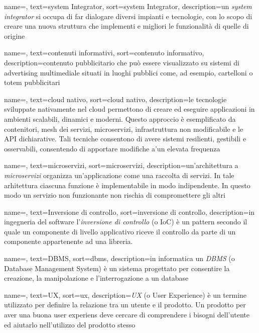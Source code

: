 {
    name=,
    text=system Integrator,
    sort=system Integrator,
    description={un \emph{system integrator} si occupa di far dialogare diversi impianti e tecnologie, con lo scopo di creare una nuova struttura che implementi e migliori le funzionalità di quelle di origine}
}

{
    name=,
    text=contenuti informativi,
    sort=contenuto informativo,
    description={contenuto pubblicitario che può essere visualizzato su sistemi di advertising multimediale situati in luoghi pubblici come, ad esempio, cartelloni o totem pubblicitari}
}

{
    name=,
    text=cloud nativo,
    sort=cloud nativo,
    description={le tecnologie sviluppate nativamente nel cloud permettono di creare ed eseguire applicazioni in ambienti scalabili, dinamici e moderni. Questo approccio è esemplificato da contenitori, mesh dei servizi, microservizi, infrastruttura non modificabile e le API dichiarative. Tali tecniche consentono di avere sistemi resilienti, gestibili e osservabili, consentendo di apportare modifiche a'un elevata frequenza}
}

{
    name=,
    text=microservizi,
    sort=microservizi,
    description={un'architettura a \emph{microservizi} organizza un'applicazione come una raccolta di servizi. In tale arhitettura ciascuna funzione è implementabile in modo indipendente. In questo modo un servizio non funzionante non rischia di compromettere gli altri}
}

{
    name=,
    text=Inversione di controllo,
    sort=inversione di controllo,
    description={in ingegneria del software l'\emph{inversione di controllo} (o IoC) è un pattern secondo il quale un componente di livello applicativo riceve il controllo da parte di un componente appartenente ad una libreria.}
}

{
    name=,
    text=DBMS,
    sort=dbms,
    description={in informatica un \emph{DBMS} (o Database Management System) è un sistema progettato per consentire la creazione, la manipolazione e l'interrogazione a un database}
}

{
    name=,
    text=UX,
    sort=ux,
    description={\emph{UX} (o User Experience) è un termine utilizzato per definire la relazione tra un utente e il prodotto. Un prodotto per aver una buona user experiens deve cercare di comprendere i bisogni dell'utente ed aiutarlo nell'utilizzo del prodotto stesso}
}

